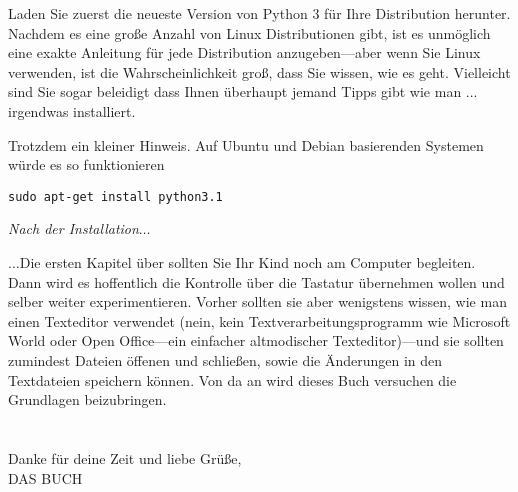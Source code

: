 \begin{LINUX}

\noindent
Laden Sie zuerst die neueste Version von Python 3 für Ihre Distribution herunter. Nachdem es eine große Anzahl von Linux Distributionen gibt, ist es unmöglich eine exakte Anleitung für jede Distribution anzugeben---aber wenn Sie Linux verwenden, ist die Wahrscheinlichkeit groß, dass Sie wissen, wie es geht. Vielleicht sind Sie sogar beleidigt dass Ihnen überhaupt jemand Tipps gibt wie man $\ldots$irgendwas installiert.

\noindent
Trotzdem ein kleiner Hinweis. Auf Ubuntu und Debian basierenden Systemen würde es so funktionieren

\begin{listing}
\begin{verbatim}
sudo apt-get install python3.1
\end{verbatim}
\end{listing}
\end{LINUX}

\noindent
\emph{\color{BrickRed}Nach der Installation$\ldots$}

\noindent
$\ldots$Die ersten Kapitel über sollten Sie Ihr Kind noch am Computer begleiten. Dann wird es hoffentlich die Kontrolle über die Tastatur übernehmen wollen und selber weiter experimentieren. Vorher sollten sie aber wenigstens wissen, wie man einen Texteditor verwendet (nein, kein Textverarbeitungsprogramm wie Microsoft World oder Open Office---ein einfacher altmodischer Texteditor)---und sie sollten zumindest Dateien öffenen und schließen, sowie die Änderungen in den Textdateien speichern können. Von da an wird dieses Buch versuchen die Grundlagen beizubringen. 
\\
\\
\noindent\\
Danke für deine Zeit und liebe Grüße,
\noindent\\
DAS BUCH
